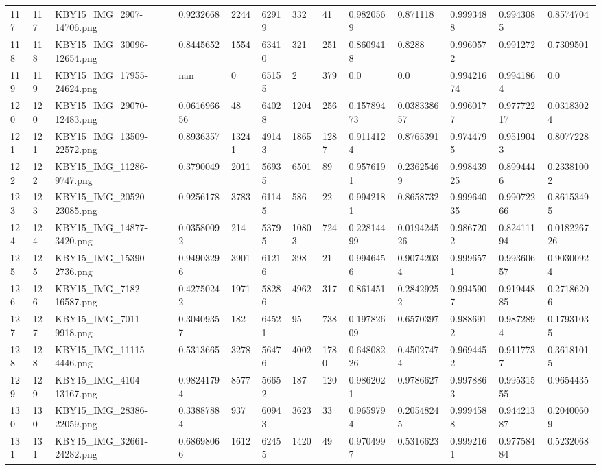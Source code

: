 \documentclass[11pt, a4paper, twoside]{report}
\begin{document}
\begin{longtable}[c]{@{}lllllllllllll@{}}
117 & 117 & KBY15\_IMG\_2907-14706.png & 0.9232668 & 2244 & 62919 & 332 & 41 & 0.9820569 & 0.871118 & 0.9993488 & 0.9943085 & 0.8574704 \\
118 & 118 & KBY15\_IMG\_30096-12654.png & 0.8445652 & 1554 & 63410 & 321 & 251 & 0.8609418 & 0.8288 & 0.9960572 & 0.991272 & 0.7309501 \\
119 & 119 & KBY15\_IMG\_17955-24624.png & nan & 0 & 65155 & 2 & 379 & 0.0 & 0.0 & 0.99421674 & 0.9941864 & 0.0 \\
120 & 120 & KBY15\_IMG\_29070-12483.png & 0.061696656 & 48 & 64028 & 1204 & 256 & 0.15789473 & 0.038338657 & 0.9960177 & 0.97772217 & 0.03183024 \\
121 & 121 & KBY15\_IMG\_13509-22572.png & 0.8936357 & 13241 & 49143 & 1865 & 1287 & 0.9114124 & 0.8765391 & 0.9744795 & 0.9519043 & 0.8077228 \\
122 & 122 & KBY15\_IMG\_11286-9747.png & 0.3790049 & 2011 & 56935 & 6501 & 89 & 0.9576191 & 0.23625469 & 0.99843925 & 0.8994446 & 0.23381002 \\
123 & 123 & KBY15\_IMG\_20520-23085.png & 0.9256178 & 3783 & 61145 & 586 & 22 & 0.9942181 & 0.8658732 & 0.99964035 & 0.99072266 & 0.86153495 \\
124 & 124 & KBY15\_IMG\_14877-3420.png & 0.03580092 & 214 & 53795 & 10803 & 724 & 0.22814499 & 0.019424526 & 0.9867202 & 0.82411194 & 0.018226726 \\
125 & 125 & KBY15\_IMG\_15390-2736.png & 0.94903296 & 3901 & 61216 & 398 & 21 & 0.9946456 & 0.90742034 & 0.9996571 & 0.99360657 & 0.90300924 \\
126 & 126 & KBY15\_IMG\_7182-16587.png & 0.42750242 & 1971 & 58286 & 4962 & 317 & 0.861451 & 0.28429252 & 0.9945907 & 0.91944885 & 0.27186206 \\
127 & 127 & KBY15\_IMG\_7011-9918.png & 0.30409357 & 182 & 64521 & 95 & 738 & 0.19782609 & 0.6570397 & 0.9886912 & 0.9872894 & 0.17931035 \\
128 & 128 & KBY15\_IMG\_11115-4446.png & 0.5313665 & 3278 & 56476 & 4002 & 1780 & 0.64808226 & 0.45027474 & 0.9694452 & 0.9117737 & 0.36181015 \\
129 & 129 & KBY15\_IMG\_4104-13167.png & 0.98241794 & 8577 & 56652 & 187 & 120 & 0.9862021 & 0.9786627 & 0.9978863 & 0.99531555 & 0.9654435 \\
130 & 130 & KBY15\_IMG\_28386-22059.png & 0.33887884 & 937 & 60943 & 3623 & 33 & 0.9659794 & 0.20548245 & 0.9994588 & 0.94421387 & 0.20400609 \\
131 & 131 & KBY15\_IMG\_32661-24282.png & 0.68698066 & 1612 & 62455 & 1420 & 49 & 0.9704997 & 0.5316623 & 0.9992161 & 0.97758484 & 0.5232068 \\

\end{longtable}
\end{document}
